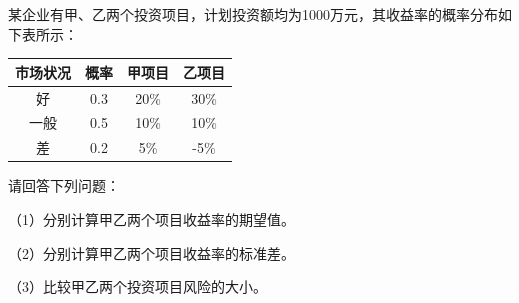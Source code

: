 \documentclass[
  10pt,
  twoside,
  openany,
  b5paper, %
  colorscheme = black, %
  xits = false,
]{qyxf-book}
\begin{document}
 某企业有甲、乙两个投资项目，计划投资额均为1000万元，其收益率的概率分布如下表所示：

\begin{center}
	\begin{tabular}{cccc}
		\toprule
		市场状况 & 概率 & 甲项目 & 乙项目 \\
		\midrule
		好 & 0.3 & 20\% & 30\% \\
		一般 & 0.5 & 10\% & 10\% \\
		差 & 0.2 & 5\% & -5\% \\ 
		\bottomrule
	\end{tabular}
\end{center}

请回答下列问题：

（1）分别计算甲乙两个项目收益率的期望值。

（2）分别计算甲乙两个项目收益率的标准差。

（3）比较甲乙两个投资项目风险的大小。
\end{document}
